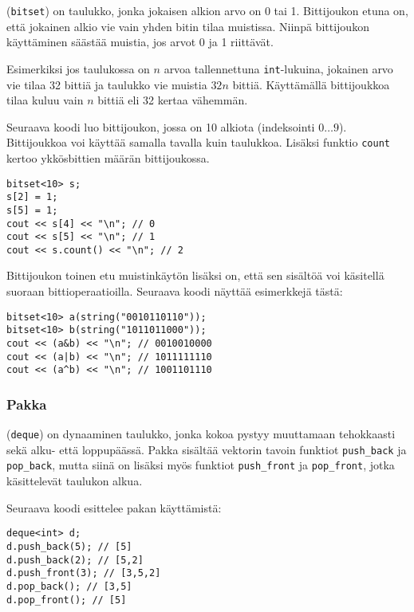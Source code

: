 
 (\texttt{bitset}) on taulukko,
jonka jokaisen alkion arvo on 0 tai 1.
Bittijoukon etuna on, että jokainen alkio
vie vain yhden bitin tilaa muistissa.
Niinpä bittijoukon käyttäminen säästää muistia,
jos arvot 0 ja 1 riittävät.

Esimerkiksi jos taulukossa on $n$ arvoa
tallennettuna \texttt{int}-lukuina,
jokainen arvo vie tilaa 32 bittiä ja taulukko
vie muistia $32n$ bittiä.
Käyttämällä bittijoukkoa tilaa
kuluu vain $n$ bittiä eli 32 kertaa vähemmän.

Seuraava koodi luo bittijoukon, jossa on 10 alkiota
(indeksointi $0 \ldots 9$).
Bittijoukkoa voi käyttää samalla tavalla kuin taulukkoa.
Lisäksi funktio \texttt{count} kertoo ykkösbittien
määrän bittijoukossa.
\begin{lstlisting}
bitset<10> s;
s[2] = 1;
s[5] = 1;
cout << s[4] << "\n"; // 0
cout << s[5] << "\n"; // 1
cout << s.count() << "\n"; // 2
\end{lstlisting}

Bittijoukon toinen etu muistinkäytön lisäksi on,
että sen sisältöä voi käsitellä suoraan bittioperaatioilla.
Seuraava koodi näyttää esimerkkejä tästä:

\begin{lstlisting}
bitset<10> a(string("0010110110"));
bitset<10> b(string("1011011000"));
cout << (a&b) << "\n"; // 0010010000
cout << (a|b) << "\n"; // 1011111110
cout << (a^b) << "\n"; // 1001101110
\end{lstlisting}

\subsubsection{Pakka}


 (\texttt{deque}) on dynaaminen taulukko,
jonka kokoa pystyy muuttamaan tehokkaasti
sekä alku- että loppupäässä.
Pakka sisältää vektorin tavoin
funktiot \texttt{push\_back}
ja \texttt{pop\_back}, mutta siinä on lisäksi myös funktiot
\texttt{push\_front} ja \texttt{pop\_front},
jotka käsittelevät taulukon alkua.

Seuraava koodi esittelee pakan käyttämistä:

\begin{lstlisting}
deque<int> d;
d.push_back(5); // [5]
d.push_back(2); // [5,2]
d.push_front(3); // [3,5,2]
d.pop_back(); // [3,5]
d.pop_front(); // [5]
\end{lstlisting}

